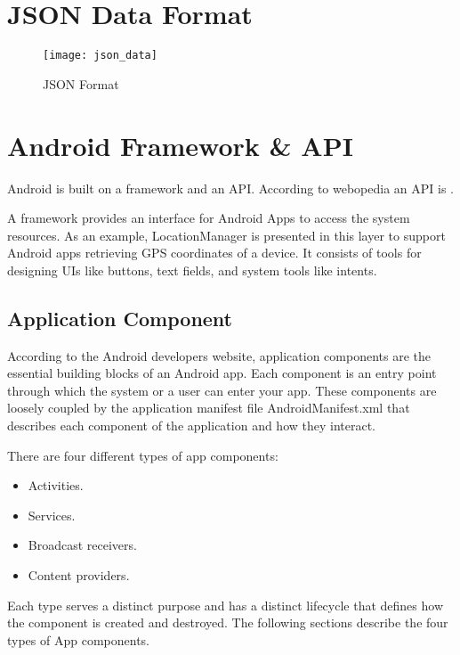 \begin{appendices}
\section{JSON Data Format}
\label{json}
\begin{figure}[h!]
	\centering       
	\texttt{[image: json\_data]}
	\caption{JSON Format}
\end{figure}




\section{Android Framework \& API}
\label{framework}
Android is built on a framework and an API. According to webopedia an API is .

A framework provides an interface for Android Apps to access the
system resources. As an example, LocationManager is presented in this layer to support Android apps retrieving GPS coordinates of a device. It consists of tools for designing UIs like buttons, text fields, and system tools like intents.

\subsection{Application Component}
According to the Android developers website, application components are the essential building blocks of an Android app. Each component is an entry point through which the system or a user can enter your app.  These components are loosely coupled by the application manifest file AndroidManifest.xml that describes each component of the application and how they interact.

There are four different types of app components:
\begin{itemize}
	\item Activities.
	\item Services.
	\item Broadcast receivers.
	\item Content providers.	
\end{itemize}
Each type serves a distinct purpose and has a distinct lifecycle that defines how the component is created and destroyed. The following sections describe the four types of App components.


\end{appendices}
